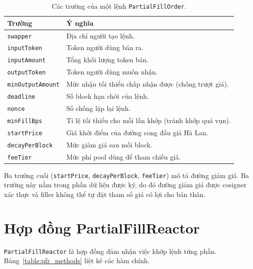 \documentclass[../DoAn.tex]{subfiles}
\begin{document}
\begin{table}[H]
    \centering
    \caption{Các trường của một lệnh \texttt{PartialFillOrder}.}
    \label{table:order_fields}
    \begin{tabular}{|l|l|}
        \hline
        \textbf{Trường} & \textbf{Ý nghĩa} \\
        \hline
        \texttt{swapper}        & Địa chỉ người tạo lệnh. \\
        \hline
        \texttt{inputToken}     & Token người dùng bán ra. \\
        \hline
        \texttt{inputAmount}    & Tổng khối lượng token bán. \\
        \hline
        \texttt{outputToken}    & Token người dùng muốn nhận. \\
        \hline
        \texttt{minOutputAmount}& Mức nhận tối thiểu chấp nhận được (chống trượt giá). \\
        \hline
        \texttt{deadline}       & Số block hạn chót của lệnh. \\
        \hline
        \texttt{nonce}          & Số chống lặp lại lệnh. \\
        \hline
        \texttt{minFillBps}     & Tỉ lệ tối thiểu cho mỗi lần khớp (tránh khớp quá vụn). \\
        \hline
        \texttt{startPrice}     & Giá khởi điểm của đường cong đấu giá Hà Lan. \\
        \hline
        \texttt{decayPerBlock}  & Mức giảm giá sau mỗi block. \\
        \hline
        \texttt{feeTier}        & Mức phí pool dùng để tham chiếu giá. \\
        \hline
    \end{tabular}
\end{table}

Ba trường cuối (\texttt{startPrice}, \texttt{decayPerBlock}, \texttt{feeTier}) mô tả đường giảm giá. Ba trường này nằm trong phần dữ liệu được ký, do đó đường giảm giá được cosigner xác thực và filler không thể tự đặt tham số giá có lợi cho bản thân.

\section{Hợp đồng PartialFillReactor}
\label{subsec:reactor}

\texttt{PartialFillReactor} là hợp đồng đảm nhận việc khớp lệnh từng phần. Bảng~\ref{table:pfr_methods} liệt kê các hàm chính.
\end{document}
